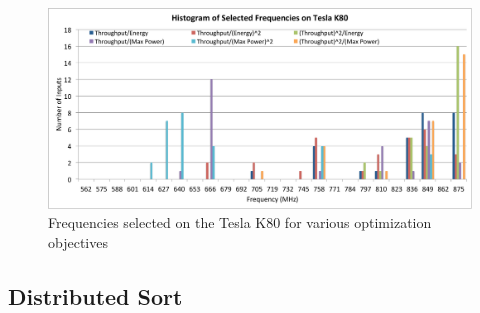 \begin{figure}[tb]
   \centering
   \includegraphics[scale=0.4]{figs/histo_k80.pdf}
   \caption{Frequencies selected on the Tesla K80 for various optimization objectives}
   \label{fig:histo-k80}
\end{figure}

\subsection{Distributed Sort}

